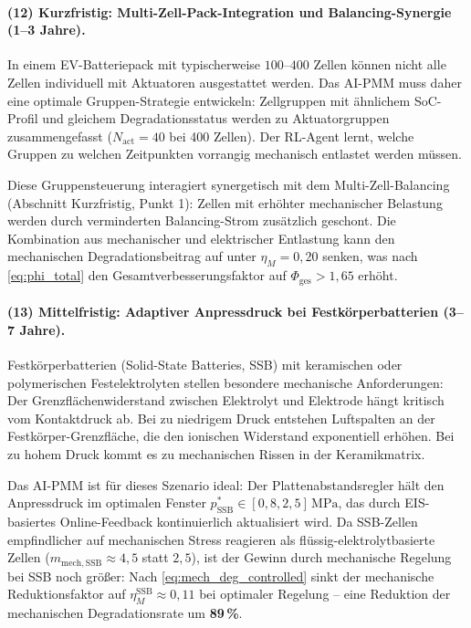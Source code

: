 ﻿\documentclass[12pt,a4paper]{article}
\begin{document}
\paragraph{(12) Kurzfristig: Multi-Zell-Pack-Integration und
	Balancing-Synergie (1--3 Jahre).}
In einem EV-Batteriepack mit typischerweise $100\text{--}400$ Zellen
können nicht alle Zellen individuell mit Aktuatoren ausgestattet werden.
Das AI-PMM muss daher eine optimale Gruppen-Strategie entwickeln:
Zellgruppen mit ähnlichem SoC-Profil und gleichem Degradationsstatus
werden zu Aktuatorgruppen zusammengefasst ($N_\mathrm{act} = 40$ bei
400 Zellen). Der RL-Agent lernt, welche Gruppen zu welchen Zeitpunkten
vorrangig mechanisch entlastet werden müssen.

Diese Gruppensteuerung interagiert synergetisch mit dem Multi-Zell-Balancing
(Abschnitt Kurzfristig, Punkt 1): Zellen mit erhöhter mechanischer Belastung
werden durch verminderten Balancing-Strom zusätzlich geschont. Die Kombination
aus mechanischer und elektrischer Entlastung kann den mechanischen Degradationsbeitrag
auf unter $\eta_M = 0{,}20$ senken, was nach \eqref{eq:phi_total} den
Gesamtverbesserungsfaktor auf $\Phi_\mathrm{ges} > 1{,}65$ erhöht.

\paragraph{(13) Mittelfristig: Adaptiver Anpressdruck bei
	Festkörperbatterien (3--7 Jahre).}
Festkörperbatterien (Solid-State Batteries, SSB) mit keramischen oder
polymerischen Festelektrolyten stellen besondere mechanische Anforderungen:
Der Grenzflächenwiderstand zwischen Elektrolyt und Elektrode hängt
kritisch vom Kontaktdruck ab. Bei zu niedrigem Druck entstehen Luftspalten
an der Festkörper-Grenzfläche, die den ionischen Widerstand exponentiell
erhöhen. Bei zu hohem Druck kommt es zu mechanischen Rissen in der
Keramikmatrix.

Das AI-PMM ist für dieses Szenario ideal: Der Plattenabstandsregler
hält den Anpressdruck im optimalen Fenster
$p^*_\mathrm{SSB} \in [0{,}8, 2{,}5]\,\mathrm{MPa}$, das durch
EIS-basiertes Online-Feedback kontinuierlich aktualisiert wird.
Da SSB-Zellen empfindlicher auf mechanischen Stress reagieren als
flüssig-elektrolytbasierte Zellen ($m_\mathrm{mech,SSB} \approx 4{,}5$
statt $2{,}5$), ist der Gewinn durch mechanische Regelung bei SSB noch
größer: Nach \eqref{eq:mech_deg_controlled} sinkt der mechanische
Reduktionsfaktor auf $\eta_M^\mathrm{SSB} \approx 0{,}11$ bei optimaler
Regelung -- eine Reduktion der mechanischen Degradationsrate um \textbf{89\,\%}.
\end{document}
